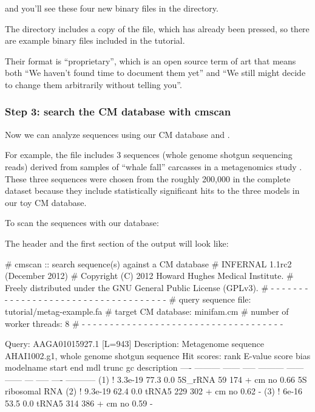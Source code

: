 and you'll see these four new binary files in the directory. 

The  directory includes a copy of the
 file, which has already been pressed, so there
are example binary files 
included in the tutorial.

Their format is ``proprietary'', which is an open source term of art
that means both ``We haven't found time to document them yet'' and ``We
still might decide to change them arbitrarily without telling you''.

\subsubsection{Step 3: search the CM database with cmscan}

Now we can analyze sequences using our CM database and
. 

For example, the file  includes 3
sequences (whole genome shotgun sequencing reads) derived from samples
of ``whale fall'' carcasses in a metagenomics study
\citep{Tringe05}. These three sequences were chosen from the roughly
200,000 in the complete dataset because they include statistically
significant hits to the three models in our toy CM database.

To scan the sequences with our database: 


The header and the first section of the output will look like:

\newpage

\begin{sreoutput}
# cmscan :: search sequence(s) against a CM database
# INFERNAL 1.1rc2 (December 2012)
# Copyright (C) 2012 Howard Hughes Medical Institute.
# Freely distributed under the GNU General Public License (GPLv3).
# - - - - - - - - - - - - - - - - - - - - - - - - - - - - - - - - - - - -
# query sequence file:                   tutorial/metag-example.fa
# target CM database:                    minifam.cm
# number of worker threads:              8
# - - - - - - - - - - - - - - - - - - - - - - - - - - - - - - - - - - - -

Query:       AAGA01015927.1  [L=943]
Description: Metagenome sequence AHAI1002.g1, whole genome shotgun sequence
Hit scores:
 rank     E-value  score  bias  modelname  start    end   mdl trunc   gc  description
 ----   --------- ------ -----  --------- ------ ------   --- ----- ----  -----------
  (1) !   3.3e-19   77.3   0.0  5S_rRNA       59    174 +  cm    no 0.66  5S ribosomal RNA
  (2) !   9.3e-19   62.4   0.0  tRNA5        229    302 +  cm    no 0.62  -
  (3) !     6e-16   53.5   0.0  tRNA5        314    386 +  cm    no 0.59  -
\end{sreoutput}

